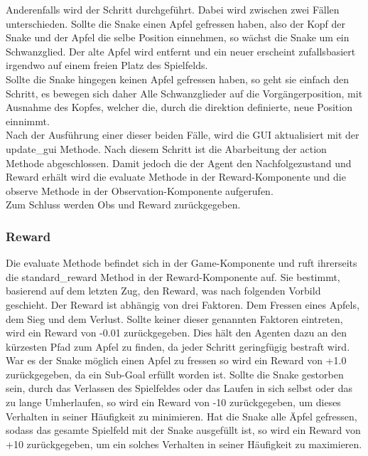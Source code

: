 Anderenfalls wird der Schritt durchgeführt. Dabei wird zwischen zwei Fällen unterschieden. Sollte die Snake einen Apfel gefressen haben, also der Kopf der Snake und der Apfel die selbe Position einnehmen, so wächst die Snake um ein Schwanzglied. Der alte Apfel wird entfernt und ein neuer erscheint zufallsbasiert irgendwo auf einem freien Platz des Spielfelds.\\
Sollte die Snake hingegen keinen Apfel gefressen haben, so geht sie einfach den Schritt, es bewegen sich daher Alle Schwanzglieder auf die Vorgängerposition, mit Ausnahme des Kopfes, welcher die, durch die direktion definierte, neue Position einnimmt.\\
Nach der Ausführung einer dieser beiden Fälle, wird die GUI aktualisiert mit der update\_gui Methode. Nach diesem Schritt ist die Abarbeitung der action Methode abgeschlossen. Damit jedoch die der Agent den Nachfolgezustand und Reward erhält wird die evaluate Methode in der Reward-Komponente und die observe Methode in der Observation-Komponente aufgerufen.\\
Zum Schluss werden Obs und Reward zurückgegeben.

\subsubsection{Reward} \label{sec:Konzept_Reward}
Die evaluate Methode befindet sich in der Game-Komponente und ruft ihrerseits die standard\_reward Method in der Reward-Komponente auf. Sie bestimmt, basierend auf dem letzten Zug, den Reward, was nach folgenden Vorbild geschieht.
Der Reward ist abhängig von drei Faktoren. Dem Fressen eines Apfels, dem Sieg und dem Verlust. Sollte keiner dieser genannten Faktoren eintreten, wird ein Reward von -0.01 zurückgegeben. Dies hält den Agenten dazu an den kürzesten Pfad zum Apfel zu finden, da jeder Schritt geringfügig bestraft wird.\\
War es der Snake möglich einen Apfel zu fressen so wird ein Reward von +1.0 zurückgegeben, da ein Sub-Goal erfüllt worden ist.
Sollte die Snake gestorben sein, durch das Verlassen des Spielfeldes oder das Laufen in sich selbst oder das zu lange Umherlaufen, so wird ein Reward von -10 zurückgegeben, um dieses Verhalten in seiner Häufigkeit zu minimieren.
Hat die Snake alle Äpfel gefressen, sodass das gesamte Spielfeld mit der Snake ausgefüllt ist, so wird ein Reward von +10 zurückgegeben, um ein solches Verhalten in seiner Häufigkeit zu maximieren.

